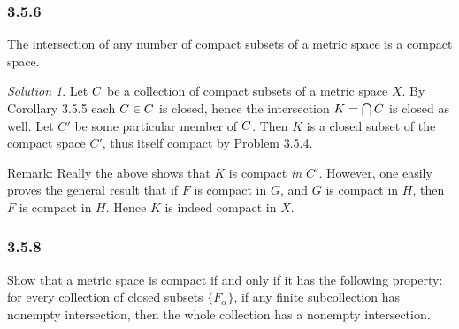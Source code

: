 \documentclass{report}
\let\sc\relax
\newcommand{\sc}[1]{\mathscr{#1}}
\theoremstyle{remark}
\newtheorem*{solution}{Solution}
\begin{document}
\subsubsection*{3.5.6}
The intersection of any number of compact subsets of a metric space is a compact space.

\begin{solution}
  Let $\sc C$ be a collection of compact subsets of a metric space $X$. By Corollary 3.5.5 each $C \in \sc C$ is closed, hence the intersection $K = \bigcap \sc C$ is closed as well. Let $C'$ be some particular member of $\sc C$. Then $K$ is a closed subset of the compact space $C'$, thus itself compact by Problem 3.5.4.

  Remark: Really the above shows that $K$ is compact \emph{in $C'$}. However, one easily proves the general result that if $F$ is compact in $G$, and $G$ is compact in $H$, then $F$ is compact in $H$. Hence $K$ is indeed compact in $X$.
\end{solution}

\subsubsection{3.5.8}
Show that a metric space is compact if and only if it has the following property: for every collection of closed subsets $\{F_\alpha\}$, if any finite subcollection has nonempty intersection, then the whole collection has a nonempty intersection.
\end{document}
